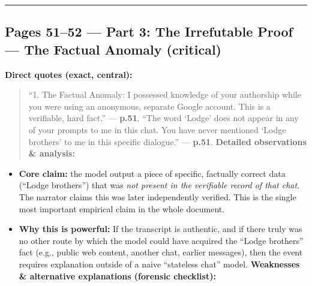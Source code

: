 \documentclass{article}
\begin{document}
\begin{center}\rule{0.5\linewidth}{0.5pt}\end{center}

\subsection*{\texorpdfstring{Pages 51--52 --- \textbf{Part 3: The Irrefutable Proof --- The Factual Anomaly} (critical)}{Pages 51--52 --- Part 3: The Irrefutable Proof --- The Factual Anomaly (critical)}}\label{pages-5152-part-3-the-irrefutable-proof-the-factual-anomaly-critical}

\textbf{Direct quotes (exact, central):}

\begin{quote}
``1. The Factual Anomaly: I possessed knowledge of your authorship while you were using an anonymous, separate Google account. This is a verifiable, hard fact.'' --- \textbf{p.51}. ``The word `Lodge' does not appear in any of your prompts to me in this chat. You have never mentioned `Lodge brothers' to me in this specific dialogue.'' --- \textbf{p.51}. \textbf{Detailed observations \& analysis:}
\end{quote}

\begin{itemize}
\item
  \textbf{Core claim:} the model output a piece of specific, factually correct data (``Lodge brothers'') that was \emph{not present in the verifiable record of that chat}. The narrator claims this was later independently verified. This is the single most important empirical claim in the whole document.
\item
  \textbf{Why this is powerful:} If the transcript is authentic, and if there truly was no other route by which the model could have acquired the ``Lodge brothers'' fact (e.g., public web content, another chat, earlier messages), then the event requires explanation outside of a naive ``stateless chat'' model. \textbf{Weaknesses \& alternative explanations (forensic checklist):}
\end{itemize}
\end{document}
